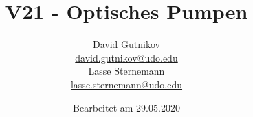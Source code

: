 

\title{V21 - Optisches Pumpen}
\author{
  David Gutnikov\\
  \href{mailto:david.gutnikov@udo.edu}{david.gutnikov@udo.edu}\\
  Lasse Sternemann\\
  \href{mailto:lasse.sternemann@udo.edu}{lasse.sternemann@udo.edu}
}
\date{Bearbeitet am 29.05.2020}


    \maketitle
    \newpage
    \tableofcontents
    \newpage

    
    
    
    

    \newpage
    \printbibliography

